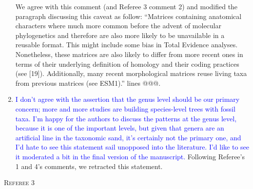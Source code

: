 \documentclass[12pt,letterpaper]{article}
\renewcommand{\section}[1]{%
\bigskip
\begin{center}
\begin{Large}
\normalfont\scshape #1
\medskip
\end{Large}
\end{center}}
\begin{document}
\begin{enumerate}
We agree with this comment (and Referee 3 comment 2) and modified the paragraph discussing this caveat as follow:
``Matrices containing anatomical characters where much more common before the advent of molecular phylogenetics and therefore are also more likely to be unavailable in a reusable format.
This might include some bias in Total Evidence analyses.
Nonetheless, these matrices are also likely to differ from more recent ones in terms of their underlying definition of homology and their coding practices (see [19]).
Additionally, many recent morphological matrices reuse living taxa from previous matrices (see ESM1).''
lines @@@.


\item{\textcolor{blue}{I don’t agree with the assertion that the genus level should be our primary concern; more and more studies are building species-level trees with fossil taxa. I’m happy for the authors to discuss the patterns at the genus level, because it is one of the important levels, but given that genera are an artificial line in the taxonomic sand, it’s certainly not the primary one, and I’d hate to see this statement sail unopposed into the literature. I’d like to see it moderated a bit in the final version of the manuscript.}}
Following Referee's 1 and 4's comments, we retracted this statement.

\end{enumerate}

\section{Referee 3}
\end{document}
